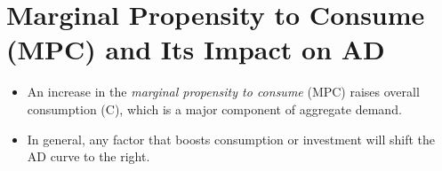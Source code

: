 \section*{Marginal Propensity to Consume (MPC) and Its Impact on AD}
\begin{itemize}
    \item An increase in the \emph{marginal propensity to consume} (MPC) raises overall consumption (C), which is a major component of aggregate demand.
    \item In general, any factor that boosts consumption or investment will shift the AD curve to the right.
\end{itemize}